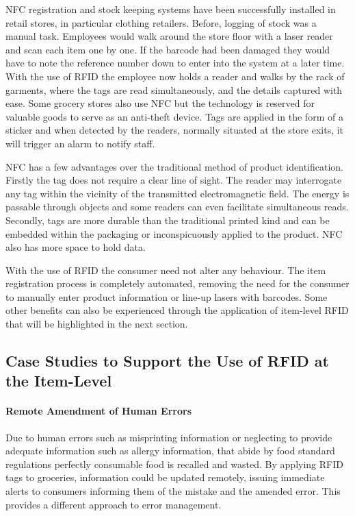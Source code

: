 \documentclass[a4paper, 11pt]{article}
\begin{document}
NFC registration and stock keeping systems have been successfully installed in retail stores, in particular clothing retailers. Before, logging of stock was a manual task. Employees would walk around the store floor with a laser reader and scan each item one by one. If the barcode had been damaged they would have to note the reference number down to enter into the system at a later time. With the use of RFID the employee now holds a reader and walks by the rack of garments, where the tags are read simultaneously, and the details captured with ease. Some grocery stores also use NFC but the technology is reserved for valuable goods to serve as an anti-theft device. Tags are applied in the form of a sticker and when detected by the readers, normally situated at the store exits, it will trigger an alarm to notify staff.

NFC has a few advantages over the traditional method of product identification. Firstly the tag does not require a clear line of sight. The reader may interrogate any tag within the vicinity of the transmitted electromagnetic field. The energy is passable through objects and some readers can even facilitate simultaneous reads. Secondly, tags are more durable than the traditional printed kind and can be embedded within the packaging or inconspicuously applied to the product. NFC also has more space to hold data.

With the use of RFID the consumer need not alter any behaviour. The item registration process is completely automated, removing the need for the consumer to manually enter product information or line-up lasers with barcodes. Some other benefits can also be experienced through the application of item-level RFID that will be highlighted in the next section.


\subsection{Case Studies to Support the Use of RFID at the Item-Level}

\paragraph{Remote Amendment of Human Errors}
Due to human errors such as misprinting information or neglecting to provide adequate information such as allergy information, that abide by food standard regulations perfectly consumable food is recalled and wasted.\cite{FDA} By applying RFID tags to groceries, information could be updated remotely, issuing immediate alerts to consumers informing them of the mistake and the amended error. This provides a different approach to error management.
\end{document}
